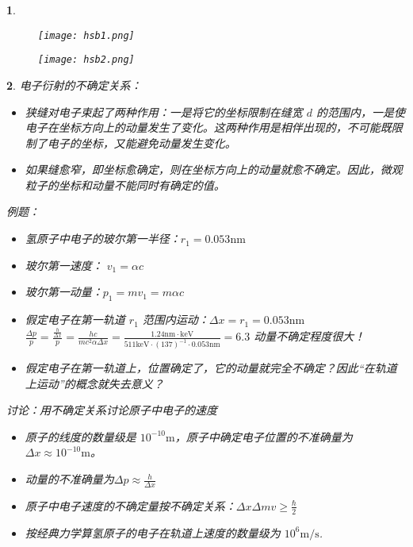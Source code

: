 \documentclass[UTF8]{report}
\theoremstyle{MyLineTheoremStyle} %
\theoremstyle{MyBlockTheoremStyle} %
\theoremstyle{MySubsubsectionStyle} %
\newtheorem{definition}{}
\begin{document}
\begin{definition}

\begin{figure}[H]
    \centering
    \texttt{[image: hsb1.png]}
\end{figure}
    
\begin{figure}[H]
    \centering
    \texttt{[image: hsb2.png]}
\end{figure}

\end{definition}   


\begin{definition}
    电子衍射的不确定关系：
    \begin{itemize}
        \item 狭缝对电子束起了两种作用：一是将它的坐标限制在缝宽 \(d\) 的范围内，一是使电子在坐标方向上的动量发生了变化。这两种作用是相伴出现的，不可能既限制了电子的坐标，又能避免动量发生变化。
        \item 如果缝愈窄，即坐标愈确定，则在坐标方向上的动量就愈不确定。因此，微观粒子的坐标和动量不能同时有确定的值。
    \end{itemize}
    
    例题：
    \begin{itemize}
        \item 氢原子中电子的玻尔第一半径：$r_1 = 0.053 \text{nm}$
        \item 玻尔第一速度： $v_1 = \alpha c$
        \item 玻尔第一动量：$p_1 = mv_1 = m\alpha c$
        \item 假定电子在第一轨道 \(r_1\) 范围内运动：$\Delta x = r_1 = 0.053 \text{nm}$ \quad $\frac{\Delta p}{p} = \frac{\frac{h}{\Delta x}}{p} = \frac{hc}{mc^2\alpha \Delta x} = \frac{1.24 \text{nm} \cdot \text{keV}}{511 \text{keV} \cdot (137)^{-1} \cdot 0.053 \text{nm}} = 6.3$    动量不确定程度很大！
        \item 假定电子在第一轨道上，位置确定了，它的动量就完全不确定？因此“在轨道上运动”的概念就失去意义？
    \end{itemize}

    \vspace{1cm}
    
    讨论：用不确定关系讨论原子中电子的速度
    \begin{itemize}
        \item 原子的线度的数量级是 \(10^{-10} \text{m}\)，原子中确定电子位置的不准确量为 \(\Delta x \approx 10^{-10} \text{m}\)。
        \item 动量的不准确量为$\Delta p \approx \frac{h}{\Delta x}$
        \item 原子中电子速度的不确定量按不确定关系：$\Delta x \Delta m v \geq \frac{\hbar}{2}$
        \item 按经典力学算氢原子的电子在轨道上速度的数量级为 $10^6 \text{m/s}$.
    \end{itemize}
\end{definition}
\end{document}
